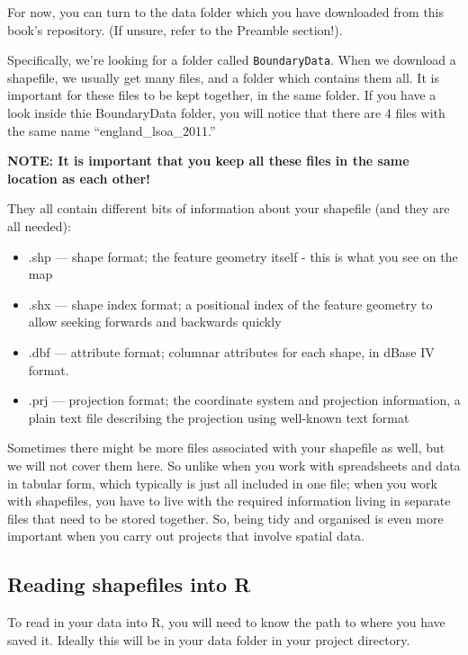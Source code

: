 \documentclass[
]{book}
\providecommand{\tightlist}{%
  \setlength{\itemsep}{0pt}\setlength{\parskip}{0pt}}
\begin{document}
For now, you can turn to the data folder which you have downloaded from this book's repository. (If unsure, refer to the Preamble section!).

Specifically, we're looking for a folder called \texttt{BoundaryData}. When we download a shapefile, we usually get many files, and a folder which contains them all. It is important for these files to be kept together, in the same folder. If you have a look inside thie BoundaryData folder, you will notice that there are 4 files with the same name ``england\_lsoa\_2011.''

\textbf{NOTE: It is important that you keep all these files in the same location as each other!}

They all contain different bits of information about your shapefile (and they are all needed):

\begin{itemize}
\tightlist
\item
  .shp --- shape format; the feature geometry itself - this is what you see on the map
\item
  .shx --- shape index format; a positional index of the feature geometry to allow seeking forwards and backwards quickly
\item
  .dbf --- attribute format; columnar attributes for each shape, in dBase IV format.
\item
  .prj --- projection format; the coordinate system and projection information, a plain text file describing the projection using well-known text format
\end{itemize}

Sometimes there might be more files associated with your shapefile as well, but we will not cover them here. So unlike when you work with spreadsheets and data in tabular form, which typically is just all included in one file; when you work with shapefiles, you have to live with the required information living in separate files that need to be stored together. So, being tidy and organised is even more important when you carry out projects that involve spatial data.

\hypertarget{reading-shapefiles-into-r}{%
\subsection{Reading shapefiles into R}\label{reading-shapefiles-into-r}}

To read in your data into R, you will need to know the path to where you have saved it. Ideally this will be in your data folder in your project directory.
\end{document}
